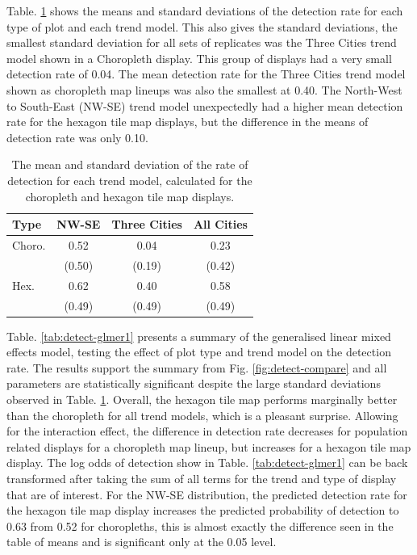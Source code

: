 \documentclass[conference,final,]{IEEEtran}
\begin{document}
Table. \ref{tab:desc-stats} shows the means and standard deviations of the detection rate for each type of plot and each trend model. This also gives the standard deviations, the smallest standard deviation for all sets of replicates was the Three Cities trend model shown in a Choropleth display. This group of displays had a very small detection rate of 0.04. The mean detection rate for the Three Cities trend model shown as choropleth map lineups was also the smallest at 0.40.
The North-West to South-East (NW-SE) trend model unexpectedly had a higher mean detection rate for the hexagon tile map displays, but the difference in the means of detection rate was only 0.10.

\begin{table}

\caption{\label{tab:desc-stats}The mean and standard deviation of the rate of detection for each trend model, calculated for the choropleth and hexagon tile map displays.}
\centering
\begin{tabular}[t]{lccc}
\toprule
Type & NW-SE & Three Cities & All Cities\\
\midrule
Choro. & 0.52 & 0.04 & 0.23\\
 & (0.50) & (0.19) & (0.42)\\
\addlinespace
Hex. & 0.62 & 0.40 & 0.58\\
 & (0.49) & (0.49) & (0.49)\\
\bottomrule
\end{tabular}
\end{table}

Table. \ref{tab:detect-glmer1} presents a summary of the generalised linear mixed effects model, testing the effect of plot type and trend model on the detection rate. The results support the summary from Fig. \ref{fig:detect-compare} and all parameters are statistically significant despite the large standard deviations observed in Table. \ref{tab:desc-stats}. Overall, the hexagon tile map performs marginally better than the choropleth for all trend models, which is a pleasant surprise. Allowing for the interaction effect, the difference in detection rate decreases for population related displays for a choropleth map lineup, but increases for a hexagon tile map display.
The log odds of detection show in Table. \ref{tab:detect-glmer1} can be back transformed after taking the sum of all terms for the trend and type of display that are of interest.
For the NW-SE distribution, the predicted detection rate for the hexagon tile map display increases the predicted probability of detection to 0.63 from 0.52 for choropleths, this is almost exactly the difference seen in the table of means and is significant only at the 0.05 level.
\end{document}
